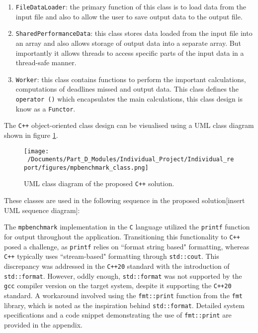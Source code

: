 \begin{enumerate}
	\item \texttt{FileDataLoader}: the primary function of this class is to load data from the input file and also to allow the user to save output data to the output file.
	\item \texttt{SharedPerformanceData}: this class stores data loaded from the input file into an array and also allows storage of output data into a separate array. But importantly it allows threads to access specific parts of the input data in a thread-safe manner. 
	\item \texttt{Worker}: this class contains functions to perform the important calculations, computations of deadlines missed and output data. This class defines the \texttt{operator ()} which encapsulates the main calculations, this class design is know as a \texttt{Functor}.
\end{enumerate}

The \texttt{C++} object-oriented class design can be visualised using a UML class diagram shown in figure \ref*{fig:mpbenchmark_UML_diagram}.

\begin{figure}[htbp] %
	\centering
	\texttt{[image: ~/Documents/Part\_D\_Modules/Individual\_Project/Individual\_report/figures/mpbenchmark\_class.png]} %
	\caption{UML class diagram of the proposed \texttt{C++} solution.}
	\label{fig:mpbenchmark_UML_diagram} %
\end{figure}

These classes are used in the following sequence in the proposed solution[insert UML sequence diagram]:

The \texttt{mpbenchmark} implementation in the \texttt{C} language utilized the \texttt{printf} function for output throughout the application. Transitioning this functionality to \texttt{C++} posed a challenge, as \texttt{printf} relies on ``format string based" formatting, whereas \texttt{C++} typically uses ``stream-based" formatting through \texttt{std::cout}. This discrepancy was addressed in the \texttt{C++20} standard with the introduction of \texttt{std::format}. However, oddly enough, \texttt{std::format} was not supported by the \texttt{gcc} compiler version on the target system, despite it supporting the \texttt{C++20} standard\cite{std_format_gcc_compiler_version}. A workaround involved using the \texttt{fmt::print} function from the \texttt{fmt} library, which is noted as the inspiration behind \texttt{std::format}\cite{fmt_printing_library}. Detailed system specifications and a code snippet demonstrating the use of \texttt{fmt::print} are provided in the appendix.

